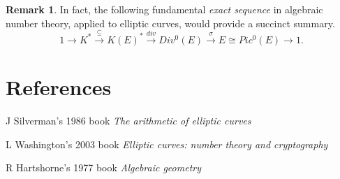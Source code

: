 \documentclass{article}
\theoremstyle{plain}
\theoremstyle{definition}
\newtheorem{remark}[n]{Remark}
\newcommand{\rb}[1]{\left( #1 \right)}
\begin{document}
\begin{remark}
In fact, the following fundamental \emph{exact sequence} in algebraic number theory, applied to elliptic curves, would provide a succinct summary.
$$ 1 \rightarrow K^* \xrightarrow{\subseteq} K\rb{E}^* \xrightarrow{div} Div^0\rb{E} \xrightarrow{\sigma} E \cong Pic^0\rb{E} \rightarrow 1. $$
\end{remark}

\section{References}

\begin{enumerate}[label={[\arabic*]}]
\item J Silverman's 1986 book \emph{The arithmetic of elliptic curves} \label{gtm}
\item L Washington's 2003 book \emph{Elliptic curves: number theory and cryptography} \label{ntc}
\item R Hartshorne's 1977 book \emph{Algebraic geometry} \label{ag}
\end{enumerate}
\end{document}

